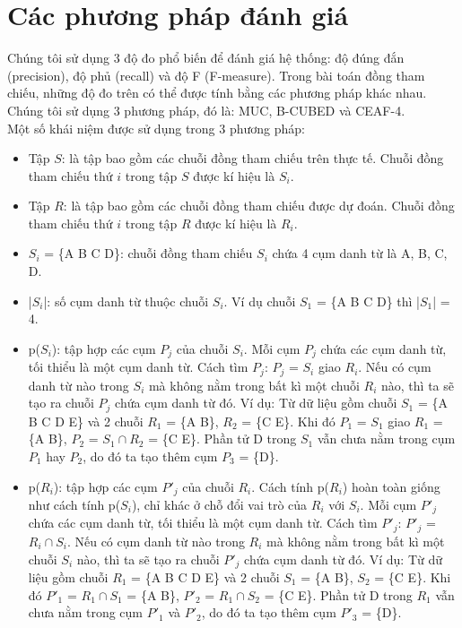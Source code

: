 \documentclass[12pt]{report}
\begin{document}
		\section{Các phương pháp đánh giá}			
				\par Chúng tôi sử dụng 3 độ đo phổ biến để đánh giá hệ thống: độ đúng đắn (precision), độ phủ (recall) và độ F (F-measure). Trong bài toán đồng tham chiếu, những độ đo trên có thể được tính bằng các phương pháp khác nhau. Chúng tôi sử dụng 3 phương pháp, đó là: MUC, B-CUBED và CEAF-4.
				\\Một số khái niệm được sử dụng trong 3 phương pháp:
					\begin{itemize}
						\item{Tập $S$: là tập bao gồm các chuỗi đồng tham chiếu trên thực tế. Chuỗi đồng tham chiếu thứ $i$ trong tập $S$ được kí hiệu là $S_i$.}
						\item{Tập $R$: là tập bao gồm các chuỗi đồng tham chiếu được dự đoán. Chuỗi đồng tham chiếu thứ $i$ trong tập $R$ được kí hiệu là $R_i$.}
						\item{$S_i$ = \{A B C D\}: chuỗi đồng tham chiếu $S_i$ chứa 4 cụm danh từ là A, B, C, D.}
						\item{|$S_i$|: số cụm danh từ thuộc chuỗi $S_i$. Ví dụ chuỗi $S_1$ = \{A B C D\} thì |$S_1$| = 4.}
						\item{p($S_i$): tập hợp các cụm $P_j$ của chuỗi $S_i$. Mỗi cụm $P_j$ chứa các cụm danh từ, tối thiểu là một cụm danh từ. Cách tìm $P_j$: $P_j$ = $S_i$ giao $R_i$. Nếu có cụm danh từ nào trong $S_i$ mà không nằm trong bất kì một chuỗi $R_i$ nào, thì ta sẽ tạo ra chuỗi $P_j$ chứa cụm danh từ đó. Ví dụ: Từ dữ liệu gồm chuỗi $S_1$ = \{A B C D E\} và 2 chuỗi $R_1$ = \{A B\}, $R_2$ = \{C E\}. Khi đó $P_1$ = $S_1$ giao $R_1$ = \{A B\}, $P_2$ = $S_1 \cap R_2$ = \{C E\}. Phần tử D trong $S_1$ vẫn chưa nằm trong cụm $P_1$ hay $P_2$, do đó ta tạo thêm cụm $P_3$ = \{D\}.}							
						\item p($R_i$): tập hợp các cụm $P'_j$ của chuỗi $R_i$. Cách tính p($R_i$) hoàn toàn giống như cách tính p($S_i$), chỉ khác ở chỗ đổi vai trò của $R_i$ với $S_i$. Mỗi cụm $P'_j$ chứa các cụm danh từ, tối thiểu là một cụm danh từ. Cách tìm $P'_j$: $P'_j$ = $R_i \cap S_i$. Nếu có cụm danh từ nào trong $R_i$ mà không nằm trong bất kì một chuỗi $S_i$ nào, thì ta sẽ tạo ra chuỗi $P'_j$ chứa cụm danh từ đó. Ví dụ: Từ dữ liệu gồm chuỗi $R_1$ = \{A B C D E\} và 2  chuỗi $S_1$ = \{A B\}, $S_2$ = \{C E\}. Khi đó $P'_1$ = $R_1 \cap S_1$ = \{A B\}, $P'_2$ = $R_1 \cap S_2$ = \{C E\}. Phần tử D trong $R_1$ vẫn chưa nằm trong cụm $P'_1$ và $P'_2$, do đó ta tạo thêm cụm $P'_3$ = \{D\}.
					\end{itemize}
\end{document}
